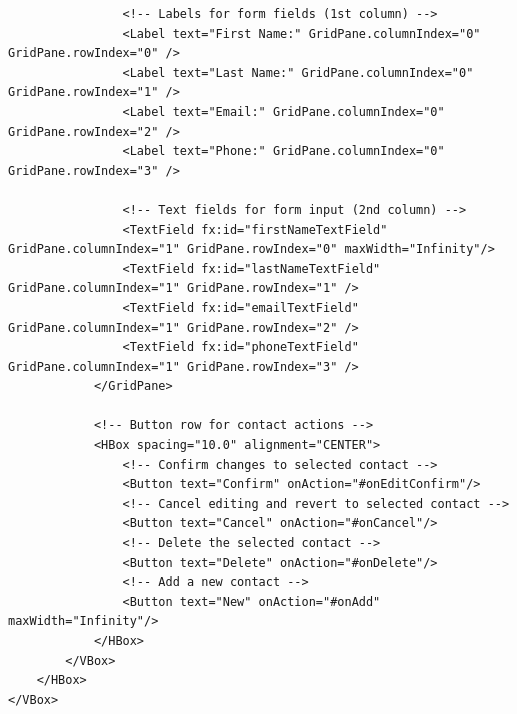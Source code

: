\documentclass{article}
\begin{document}
\begin{verbatim}
                <!-- Labels for form fields (1st column) -->
                <Label text="First Name:" GridPane.columnIndex="0" GridPane.rowIndex="0" />
                <Label text="Last Name:" GridPane.columnIndex="0" GridPane.rowIndex="1" />
                <Label text="Email:" GridPane.columnIndex="0" GridPane.rowIndex="2" />
                <Label text="Phone:" GridPane.columnIndex="0" GridPane.rowIndex="3" />

                <!-- Text fields for form input (2nd column) -->
                <TextField fx:id="firstNameTextField" GridPane.columnIndex="1" GridPane.rowIndex="0" maxWidth="Infinity"/>
                <TextField fx:id="lastNameTextField" GridPane.columnIndex="1" GridPane.rowIndex="1" />
                <TextField fx:id="emailTextField" GridPane.columnIndex="1" GridPane.rowIndex="2" />
                <TextField fx:id="phoneTextField" GridPane.columnIndex="1" GridPane.rowIndex="3" />
            </GridPane>

            <!-- Button row for contact actions -->
            <HBox spacing="10.0" alignment="CENTER">
                <!-- Confirm changes to selected contact -->
                <Button text="Confirm" onAction="#onEditConfirm"/>
                <!-- Cancel editing and revert to selected contact -->
                <Button text="Cancel" onAction="#onCancel"/>
                <!-- Delete the selected contact -->
                <Button text="Delete" onAction="#onDelete"/>
                <!-- Add a new contact -->
                <Button text="New" onAction="#onAdd" maxWidth="Infinity"/>
            </HBox>
        </VBox>
    </HBox>
</VBox>
\end{verbatim}
\end{document}
